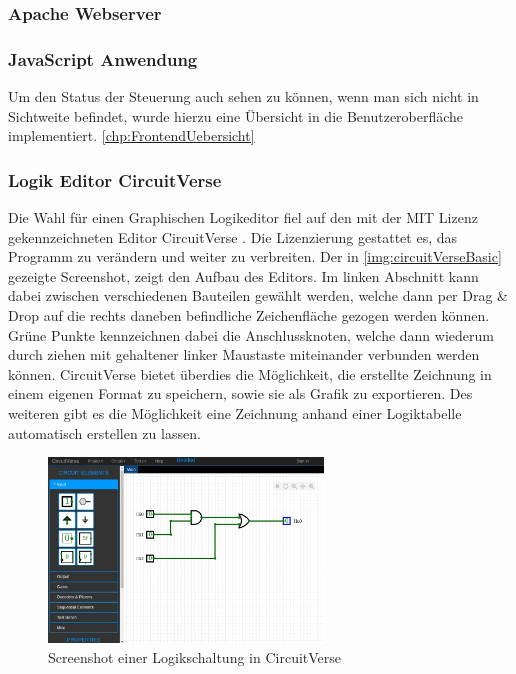 \subsubsection{Apache Webserver}

\subsubsection{JavaScript Anwendung}\label{chp:ums:JavaScriptFront}
Um den Status der Steuerung auch sehen zu können, wenn man sich nicht in Sichtweite befindet, wurde hierzu eine Übersicht in die Benutzeroberfläche implementiert. \autoref{chp:FrontendUebersicht}

\subsubsection{Logik Editor CircuitVerse}\label{kap:circuitVerse}
Die Wahl für einen Graphischen Logikeditor fiel auf den mit der MIT Lizenz gekennzeichneten Editor CircuitVerse \cite{URL:CircuitVerse}. Die Lizenzierung gestattet es, das Programm zu verändern und weiter zu verbreiten. Der in \autoref{img:circuitVerseBasic} gezeigte Screenshot, zeigt den Aufbau des Editors. Im linken Abschnitt kann dabei zwischen verschiedenen Bauteilen gewählt werden, welche dann per Drag \& Drop auf die rechts daneben befindliche Zeichenfläche gezogen werden können. Grüne Punkte kennzeichnen dabei die Anschlussknoten, welche dann wiederum durch ziehen mit gehaltener linker Maustaste miteinander verbunden werden können. CircuitVerse bietet überdies die Möglichkeit, die erstellte Zeichnung in einem eigenen Format zu  speichern, sowie sie als Grafik zu exportieren. Des weiteren gibt es die Möglichkeit eine Zeichnung anhand einer Logiktabelle automatisch erstellen zu lassen. 

\begin{figure}[H]
	\begin{center}
		\includegraphics[width=0.65\textwidth ,clip]{./images/circuitverse.jpg}
		\caption{Screenshot einer Logikschaltung in CircuitVerse}
		\label{img:circuitVerseBasic}
	\end{center} 
\end{figure}	

